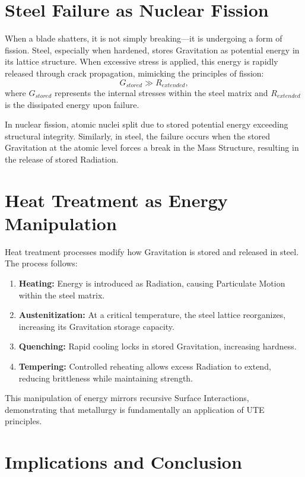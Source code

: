 \documentclass{article}
\begin{document}
\section{Steel Failure as Nuclear Fission}

When a blade shatters, it is not simply breaking—it is undergoing a form of fission. Steel, especially when hardened, stores Gravitation as potential energy in its lattice structure. When excessive stress is applied, this energy is rapidly released through crack propagation, mimicking the principles of fission:
\begin{equation}
    G_{stored} \gg R_{extended},
\end{equation}
where $G_{stored}$ represents the internal stresses within the steel matrix and $R_{extended}$ is the dissipated energy upon failure.

In nuclear fission, atomic nuclei split due to stored potential energy exceeding structural integrity. Similarly, in steel, the failure occurs when the stored Gravitation at the atomic level forces a break in the Mass Structure, resulting in the release of stored Radiation.

\section{Heat Treatment as Energy Manipulation}

Heat treatment processes modify how Gravitation is stored and released in steel. The process follows:
\begin{enumerate}
    \item \textbf{Heating:} Energy is introduced as Radiation, causing Particulate Motion within the steel matrix.
    \item \textbf{Austenitization:} At a critical temperature, the steel lattice reorganizes, increasing its Gravitation storage capacity.
    \item \textbf{Quenching:} Rapid cooling locks in stored Gravitation, increasing hardness.
    \item \textbf{Tempering:} Controlled reheating allows excess Radiation to extend, reducing brittleness while maintaining strength.
\end{enumerate}

This manipulation of energy mirrors recursive Surface Interactions, demonstrating that metallurgy is fundamentally an application of UTE principles.

\section{Implications and Conclusion}
\end{document}
